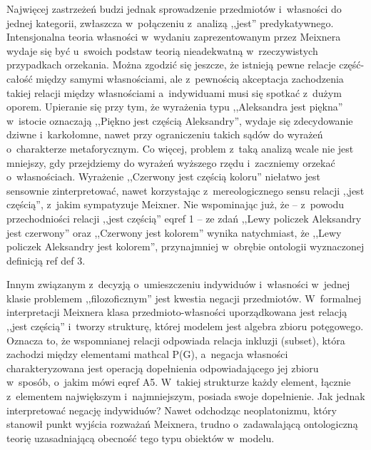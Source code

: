 Najwięcej zastrzeżeń budzi jednak sprowadzenie przedmiotów i~własności do jednej kategorii, zwłaszcza w~połączeniu z~analizą ,,jest'' predykatywnego. Intensjonalna teoria własności w~wydaniu zaprezentowanym przez Meixnera wydaje się być u~swoich podstaw teorią nieadekwatną w~rzeczywistych przypadkach orzekania. Można zgodzić się jeszcze, że istnieją pewne relacje część-całość między samymi własnościami, ale z~pewnością akceptacja zachodzenia takiej relacji między własnościami a~indywiduami musi się spotkać z~dużym oporem. Upieranie się przy tym, że wyrażenia typu ,,Aleksandra jest piękna'' w~istocie oznaczają ,,Piękno jest częścią Aleksandry'', wydaje się zdecydowanie dziwne i~karkołomne, nawet przy ograniczeniu takich sądów do wyrażeń o~charakterze metaforycznym. Co więcej, problem z~taką analizą wcale nie jest mniejszy, gdy przejdziemy do wyrażeń wyższego rzędu i~zaczniemy orzekać o~własnościach. Wyrażenie ,,Czerwony jest częścią koloru'' niełatwo jest sensownie zinterpretować, nawet korzystając z~mereologicznego sensu relacji ,,jest częścią'', z~jakim sympatyzuje Meixner. Nie wspominając już, że -- z~powodu przechodniości relacji ,,jest częścią'' eqref 1 -- ze zdań ,,Lewy policzek Aleksandry jest czerwony'' oraz ,,Czerwony jest kolorem'' wynika natychmiast, że ,,Lewy policzek Aleksandry jest kolorem'', przynajmniej w~obrębie ontologii wyznaczonej definicją ref def 3.

Innym związanym z~decyzją o~umieszczeniu indywiduów i~własności w~jednej klasie problemem ,,filozoficznym'' jest kwestia negacji przedmiotów. W~formalnej interpretacji Meixnera klasa przedmioto-własności uporządkowana jest relacją ,,jest częścią'' i~tworzy strukturę, której modelem jest algebra zbioru potęgowego. Oznacza to, że wspomnianej relacji odpowiada relacja inkluzji (subset), która zachodzi między elementami mathcal P(G), a~negacja własności charakteryzowana jest operacją dopełnienia odpowiadającego jej zbioru w~sposób, o~jakim mówi eqref A5. W~takiej strukturze każdy element, łącznie z~elementem największym i~najmniejszym, posiada swoje dopełnienie. Jak jednak interpretować negację indywiduów? Nawet odchodząc neoplatonizmu, który stanowił punkt wyjścia rozważań Meixnera, trudno o~zadawalającą ontologiczną teorię uzasadniającą obecność tego typu obiektów w~modelu.

